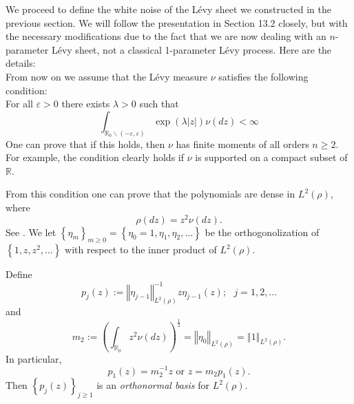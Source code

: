 \documentclass[12pt]{article}%
\numberwithin{equation}{section}
\def\R{\mathbb{R}}
\def\realio{\mathbb{R}_{0}}
\begin{document}
We proceed to define the white noise of the L\'{e}vy sheet we constructed in the previous section. We will follow the presentation in \cite{DOP} Section 13.2  closely, but with the necessary modifications due to the fact that we are now dealing with an $n$-parameter L\'{e}vy sheet, not a classical 1-parameter L\'{e}vy process. Here are the details:\\

From now on we assume that the L\'{e}vy measure $\nu $ satisfies the
following condition:\\
For all $\varepsilon >0$ there exists $\lambda >0$ such that
\begin{equation}
\int_{\realio\backslash (-\varepsilon ,\varepsilon )}\exp (\lambda
\left\vert z\right\vert )\nu (dz)<\infty   \label{nu}
\end{equation}
One can prove that if this holds, then $\nu $ has finite moments of all orders $n\geq 2$. 
For example, the condition clearly holds if $\nu $ is supported on a compact subset of $\R$.

From this condition one can prove that the polynomials are dense in $L^{2}(\rho )$,
where
\begin{equation}
\rho (dz)=z^{2}\nu (dz).  
\end{equation}
See \cite{NualartSchoutens}. We let $\left\{\eta_{m}\right\} _{m\geq 0}=\left\{ \eta_0 =1,\eta_{1},\eta_{2},...\right\} $ \label{simb-1303} be the orthogonolization of
$\left\{1,z,z^{2},...\right\} $ with respect to the inner product of $L^{2}(\rho )$.

Define
\begin{equation}
p_{j}(z):=\left\Vert \eta_{j-1}\right\Vert _{L^{2}(\rho )}^{-1}z\eta_{j-1}(z);
\text{ }j=1,2,...  \label{10.3}
\end{equation}
and
\begin{equation}
m_{2}:=\left( \int_{\realio} z^{2}\nu (dz)\right) ^{\frac{1}{2}}
=\left\Vert \eta_{0}\right\Vert _{L^{2}(\rho )}
=\left\Vert 1\right\Vert_{L^{2}(\rho )}.  \label{10.4}
\end{equation}
In particular,
\begin{equation}
p_{1}(z)=m_{2}^{-1}z\text{ or }z=m_{2}p_{1}(z).  \label{10.5}
\end{equation}
Then $\left\{ p_{j}(z)\right\} _{j\geq 1}$ is an \emph{orthonormal basis}
for $L^{2}(\rho )$.
\end{document}
